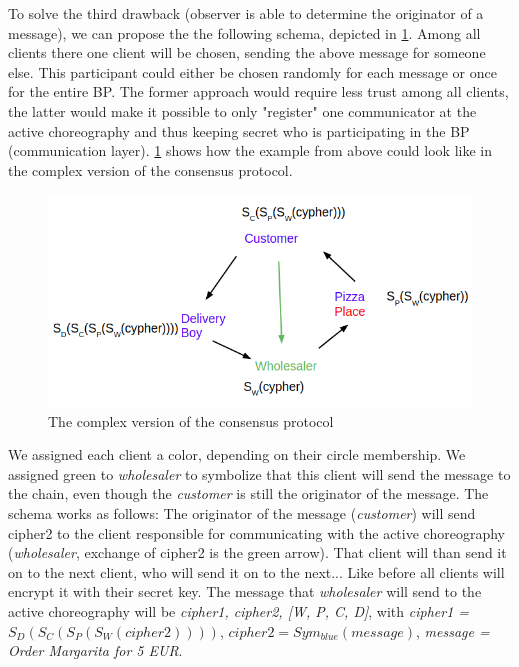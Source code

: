 \documentclass[runningheads]{llncs}
\begin{document}
To solve the third drawback (observer is able to determine the originator of a message), we can propose the the following schema, depicted in \ref{fig:complex}. Among all clients there one client will be chosen, sending the above message for someone else. This participant could either be chosen randomly for each message or once for the entire BP. The former approach would require less trust among all clients, the latter would make it possible to only "register" one communicator at the active choreography and thus keeping secret who is participating in the BP (communication layer). \ref{fig:complex} shows how the example from above could look like in the complex version of the consensus protocol.

\begin{figure}
    \centering
    \includegraphics[scale=0.6]{complex.png}
    \caption{The complex version of the consensus protocol}
    \label{fig:complex}
\end{figure}


We assigned each client a color, depending on their circle membership. We assigned green to \textit{wholesaler} to symbolize that this client will send the message to the chain, even though the \textit{customer} is still the originator of the message. The schema works as follows: The originator of the message (\textit{customer}) will send cipher2 to the client responsible for communicating with the active choreography (\textit{wholesaler}, exchange of cipher2 is the green arrow). That client will than send it on to the next client, who will send it on to the next... Like before all clients will encrypt it with their secret key. The message that \textit{wholesaler} will send to the active choreography will be \textit{cipher1, cipher2, [W, P, C, D]}, with \textit{cipher1 =} $S_D(S_C(S_P(S_W(cipher2))))$, $cipher2 = Sym_{blue}(message)$, \textit{message = Order Margarita for 5 EUR}. 
\end{document}
